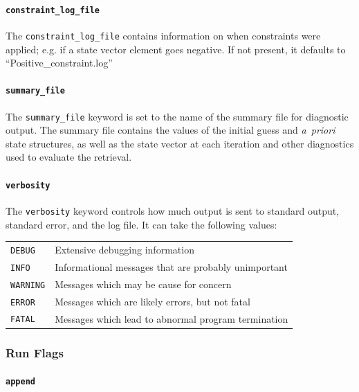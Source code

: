 \documentclass{article}
\begin{document}
\paragraph{\texttt{constraint\_log\_file}}

The \texttt{constraint\_log\_file} contains information on when
constraints were applied; e.g. if a state vector element goes
negative.  If not present, it defaults to ``Positive\_constraint.log''

\paragraph{\texttt{summary\_file}}

The \texttt{summary\_file} keyword is set to the name of the summary file for
diagnostic output.  The summary file contains the values of the
initial guess and \textit{a~priori\/} state structures, as well as the
state vector at each iteration and other diagnostics used to evaluate
the retrieval.

\paragraph{\texttt{verbosity}}

The \texttt{verbosity} keyword controls how much output is sent to
standard output, standard error, and the log file.  It can take the
following values:

\begin{tabular}{|l|l|}
\hline
\texttt{DEBUG}  &Extensive debugging information                      \\
\texttt{INFO}   &Informational messages that are probably unimportant \\
\texttt{WARNING}&Messages which may be cause for concern              \\
\texttt{ERROR}  &Messages which are likely errors, but not fatal      \\
\texttt{FATAL}  & Messages which lead to abnormal program termination \\
\hline
\end{tabular}

\subsubsection{Run Flags}

\paragraph{\texttt{append}}
\end{document}
